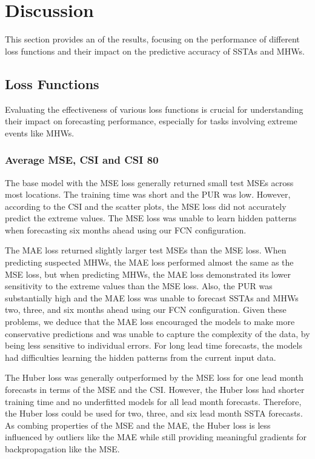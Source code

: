 \documentclass[11pt, a4paper]{article}
\begin{document}
\section{Discussion}

This section provides an of the results, focusing on the performance of different loss functions and their impact on the predictive accuracy of SSTAs and MHWs.

\subsection{Loss Functions}

Evaluating the effectiveness of various loss functions is crucial for understanding their impact on forecasting performance, especially for tasks involving extreme events like MHWs.

\subsubsection{Average MSE, CSI and CSI 80}

The base model with the MSE loss generally returned small test MSEs across most locations. The training time was short and the PUR was low. However, according to the CSI and the scatter plots, the MSE loss did not accurately predict the extreme values. The MSE loss was unable to learn hidden patterns when forecasting six months ahead using our FCN configuration.

The MAE loss returned slightly larger test MSEs than the MSE loss. When predicting suspected MHWs, the MAE loss performed almost the same as the MSE loss, but when predicting MHWs, the MAE loss demonstrated its lower sensitivity to the extreme values than the MSE loss. Also, the PUR was substantially high and the MAE loss was unable to forecast SSTAs and MHWs two, three, and six months ahead using our FCN configuration. Given these problems, we deduce that the MAE loss encouraged the models to make more conservative predictions and was unable to capture the complexity of the data, by being less sensitive to individual errors. For long lead time forecasts, the models had difficulties learning the hidden patterns from the current input data.

The Huber loss was generally outperformed by the MSE loss for one lead month forecasts in terms of the MSE and the CSI. However, the Huber loss had shorter training time and no underfitted models for all lead month forecasts. Therefore, the Huber loss could be used for two, three, and six lead month SSTA forecasts. As combing properties of the MSE and the MAE, the Huber loss is less influenced by outliers like the MAE while still providing meaningful gradients for backpropagation like the MSE.
\end{document}
